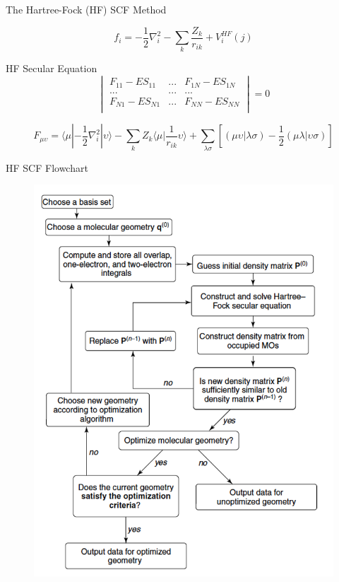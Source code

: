 \documentclass[aspectratio=169]{beamer}
\begin{document}
    \begin{frame}{The Hartree-Fock (HF) SCF Method}

        \begin{equation*}
            f_i = - \frac{1}{2}\nabla_i^2
            -\sum_k \frac{Z_k}{r_{ik}} + V_i^{HF}(j)
        \end{equation*}

        \begin{alertblock}{HF Secular Equation}
            \begin{equation*}
                \begin{vmatrix}
                    F_{11}-ES_{11} & ... & F_{1N}-ES_{1N} \\
                    ...            & ... & ...            \\
                    F_{N1}-ES_{N1} & ... & F_{NN}-ES_{NN} \\
                \end{vmatrix}
                = 0
            \end{equation*}
        \end{alertblock}

        \begin{equation*}
            F_{\mu\upsilon} = \langle \mu | - \frac{1}{2}\nabla_i^2 | \upsilon \rangle
            -\sum_k Z_k \langle \mu |\frac{1}{r_{ik}}\upsilon \rangle + \sum_{\lambda \sigma} [ (\mu\upsilon| \lambda\sigma) - \frac{1}{2} (\mu\lambda| \upsilon\sigma)]
        \end{equation*}

    \end{frame}

    \begin{frame}{HF SCF Flowchart}
        \begin{figure}
            \centering
            \includegraphics[width=0.35\linewidth]{lectures/figures/2_HF_SCF_Flowchart.png}

        \end{figure}

    \end{frame}
\end{document}
